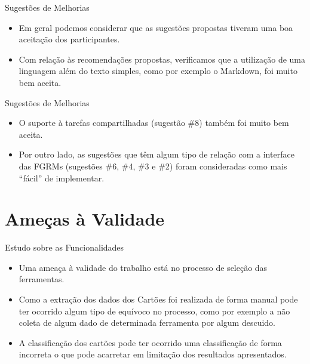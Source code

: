 \documentclass[t,14pt,mathserif]{beamer}
\begin{document}
\begin{frame}{Sugestões de Melhorias}
    \begin{itemize}
        \item Em geral podemos considerar que as sugestões propostas tiveram uma
            boa aceitação dos participantes.
        \item Com relação às recomendações propostas, verificamos que a
            utilização de uma linguagem além do texto simples, como por exemplo
            o Markdown, foi muito bem aceita.
    \end{itemize}
\end{frame}

\begin{frame}{Sugestões de Melhorias}
    \begin{itemize}
        \item O suporte à tarefas compartilhadas (sugestão \#8) também foi muito
            bem aceita.
        \item Por outro lado, as sugestões que têm algum tipo de relação com a
            interface das FGRMs (sugestões \#6, \#4, \#3 e \#2) foram
            consideradas como mais ``fácil'' de implementar.
    \end{itemize}
\end{frame}
\section{Ameças à Validade}

\begin{frame}{Estudo sobre as Funcionalidades}
    \begin{itemize}
        \item Uma ameaça à validade do trabalho está no processo de seleção das
            ferramentas.
        \item Como a extração dos dados dos Cartões foi realizada de forma
            manual pode ter ocorrido algum tipo de equívoco no processo, como
            por exemplo a não coleta de algum dado de determinada ferramenta por
            algum descuido.
        \item A classificação dos cartões pode ter ocorrido uma classificação de
            forma incorreta o que pode acarretar em limitação dos resultados
            apresentados.
    \end{itemize}

\end{frame}
\end{document}
